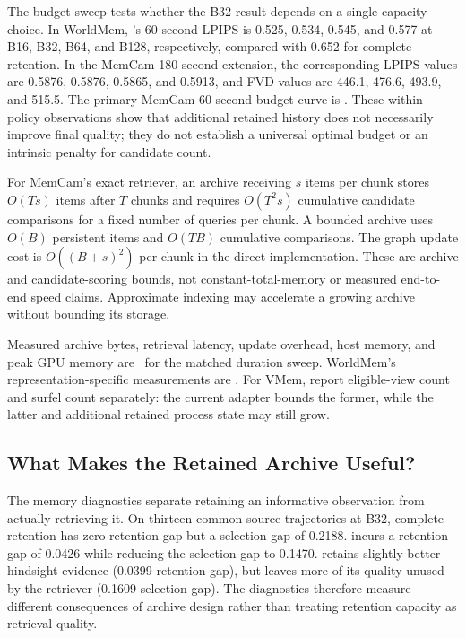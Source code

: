 The budget sweep tests whether the B32 result depends on a single capacity
choice. In WorldMem, \Geo's 60-second LPIPS is 0.525, 0.534, 0.545, and
0.577 at B16, B32, B64, and B128, respectively, compared with 0.652 for
complete retention. In the MemCam 180-second extension, the corresponding
LPIPS values are 0.5876, 0.5876, 0.5865, and 0.5913, and FVD values are
446.1, 476.6, 493.9, and 515.5. The primary MemCam 60-second budget curve
is \TBD. These within-policy observations show that additional retained
history does not necessarily improve final quality; they do not establish
a universal optimal budget or an intrinsic penalty for candidate count.

For MemCam's exact retriever, an archive receiving $s$ items per chunk stores
$O(Ts)$ items after $T$ chunks and requires $O(T^2s)$ cumulative candidate
comparisons for a fixed number of queries per chunk. A bounded archive uses
$O(B)$ persistent items and $O(TB)$ cumulative comparisons. The graph update
cost is $O((B+s)^2)$ per chunk in the direct implementation. These are
archive and candidate-scoring bounds, not constant-total-memory or measured
end-to-end speed claims. Approximate indexing may accelerate a growing
archive without bounding its storage.

Measured archive bytes, retrieval latency, update overhead, host memory,
and peak GPU memory are \TBD\ for the matched duration sweep. WorldMem's
representation-specific measurements are \TBD. For VMem, report eligible-view
count and surfel count separately: the current adapter bounds the former,
while the latter and additional retained process state may still grow.

\subsection{What Makes the Retained Archive Useful?}
\label{sec:exp-mechanism}

The memory diagnostics separate retaining an informative observation from
actually retrieving it. On thirteen common-source trajectories at B32,
complete retention has zero retention gap but a selection gap of 0.2188.
\Geo incurs a retention gap of 0.0426 while reducing the selection gap to
0.1470. \RI retains slightly better hindsight evidence (0.0399 retention
gap), but leaves more of its quality unused by the retriever (0.1609
selection gap). The diagnostics therefore measure different consequences
of archive design rather than treating retention capacity as retrieval quality.


